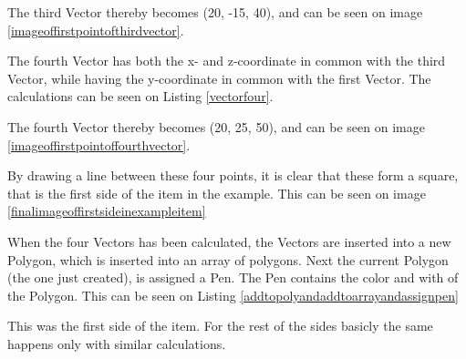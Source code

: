 
The third Vector thereby becomes (20, -15, 40), and can be seen on image \ref{imageoffirstpointofthirdvector}.


The fourth Vector has both the x- and z-coordinate in common with the third Vector, while having the y-coordinate in common with the first Vector. The calculations can be seen on Listing \ref{vectorfour}.


The fourth Vector thereby becomes (20, 25, 50), and can be seen on image \ref{imageoffirstpointoffourthvector}.


By drawing a line between these four points, it is clear that these form a square, that is the first side of the item in the example. This can be seen on image \ref{finalimageoffirstsideinexampleitem}

When the four Vectors has been calculated, the Vectors are inserted into a new Polygon, which is inserted into an array of polygons.  Next the current Polygon (the one just created), is assigned a Pen. The Pen contains the color and with of the Polygon. This can be seen on Listing \ref{addtopolyandaddtoarrayandassignpen}


This was the first side of the item. For the rest of the sides basicly the same happens only with similar calculations. 